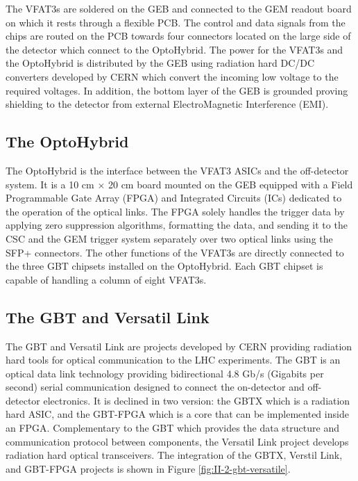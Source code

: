       The VFAT3s are soldered on the GEB and connected to the GEM readout board on which it rests through a flexible PCB. The control and data signals from the chips are routed on the PCB towards four connectors located on the large side of the detector which connect to the OptoHybrid. The power for the VFAT3s and the OptoHybrid is distributed by the GEB using radiation hard DC/DC converters developed by CERN which convert the incoming low voltage to the required voltages. In addition, the bottom layer of the GEB is grounded proving shielding to the detector from external ElectroMagnetic Interference (EMI).

    \subsection{The OptoHybrid}

      The OptoHybrid is the interface between the VFAT3 ASICs and the off-detector system. It is a 10 cm $ \times $ 20 cm board mounted on the GEB equipped with a Field Programmable Gate Array (FPGA) and Integrated Circuits (ICs) dedicated to the operation of the optical links. The FPGA solely handles the trigger data by applying zero suppression algorithms, formatting the data, and sending it to the CSC and the GEM trigger system separately over two optical links using the SFP+ connectors. The other functions of the VFAT3s are directly connected to the three GBT chipsets installed on the OptoHybrid. Each GBT chipset is capable of handling a column of eight VFAT3s.

    \subsection{The GBT and Versatil Link}

      The GBT \cite{Moreira:1235836} and Versatil Link \cite{Soos:1609037} are projects developed by CERN providing radiation hard tools for optical communication to the LHC experiments. The GBT is an optical data link technology providing bidirectional 4.8 Gb/s (Gigabits per second) serial communication designed to connect the on-detector and off-detector electronics. It is declined in two version: the GBTX which is a radiation hard ASIC, and the GBT-FPGA which is a core that can be implemented inside an FPGA. Complementary to the GBT which provides the data structure and communication protocol between components, the Versatil Link project develops radiation hard optical transceivers. The integration of the GBTX, Verstil Link, and GBT-FPGA projects is shown in Figure \ref{fig:II-2-gbt-versatile}. \\

